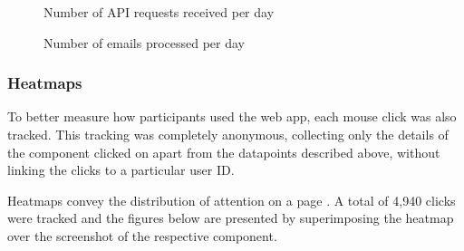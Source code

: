 \documentclass{article}
\begin{document}
\begin{figure}
	\centering
	\begin{minipage}{.47\textwidth}
		\caption{Number of API requests received per day}
	\end{minipage}%
	\hspace{.5cm}
	\begin{minipage}{.47\textwidth}
		\caption{Number of emails processed per day}
	\end{minipage}
\end{figure}

\subsubsection{Heatmaps}

To better measure how participants used the web app, each mouse click was also tracked. This tracking was completely anonymous, collecting only the details of the component clicked on apart from the datapoints described above, without linking the clicks to a particular user ID.

Heatmaps convey the distribution of attention on a page \cite{gu_predicting_2020}. A total of 4,940 clicks were tracked and the figures below are presented by superimposing the heatmap over the screenshot of the respective component.
\end{document}
